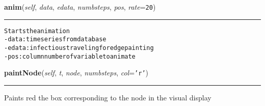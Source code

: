     \label{Epigrass:epiplay:viewer:anim}

    \vspace{0.5ex}

    \begin{boxedminipage}{\textwidth}

    \raggedright \textbf{anim}(\textit{self}, \textit{data}, \textit{edata}, \textit{numbsteps}, \textit{pos}, \textit{rate}=\texttt{20})

    \vspace{-1.5ex}

    \rule{\textwidth}{0.5\fboxrule}
\begin{alltt}

Starts the animation
- data: time series from database
- edata: infectious traveling for edge painting
- pos: column number of variable to animate
\end{alltt}

    \vspace{1ex}

    \end{boxedminipage}

    \label{Epigrass:epiplay:viewer:paintNode}

    \vspace{0.5ex}

    \begin{boxedminipage}{\textwidth}

    \raggedright \textbf{paintNode}(\textit{self}, \textit{t}, \textit{node}, \textit{numbsteps}, \textit{col}=\texttt{'r'})

    \vspace{-1.5ex}

    \rule{\textwidth}{0.5\fboxrule}
    Paints red the box corresponding to the node in the visual display

    \vspace{1ex}

    \end{boxedminipage}

    \label{Epigrass:epiplay:viewer:plotTs}

